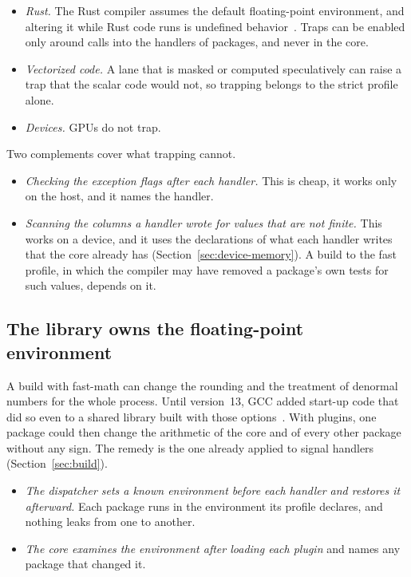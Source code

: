\documentclass[11pt,a4paper]{article}
\begin{document}
\begin{itemize}
  \item \emph{Rust.}  The Rust compiler assumes the default floating-point
        environment, and altering it while Rust code runs is undefined
        behavior~\cite{rustfenv}.  Traps can be enabled only around calls
        into the handlers of packages, and never in the core.
  \item \emph{Vectorized code.}  A lane that is masked or computed
        speculatively can raise a trap that the scalar code would not, so
        trapping belongs to the strict profile alone.
  \item \emph{Devices.}  GPUs do not trap.
\end{itemize}

Two complements cover what trapping cannot.

\begin{itemize}
  \item \emph{Checking the exception flags after each handler.}  This is
        cheap, it works only on the host, and it names the handler.
  \item \emph{Scanning the columns a handler wrote for values that are not
        finite.}  This works on a device, and it uses the declarations of
        what each handler writes that the core already has
        (Section~\ref{sec:device-memory}).  A build to the fast profile, in
        which the compiler may have removed a package's own tests for such
        values, depends on it.
\end{itemize}

\subsection{The library owns the floating-point environment}

A build with fast-math can change the rounding and the treatment of
denormal numbers for the whole process.  Until version~13, GCC added
start-up code that did so even to a shared library built with those
options~\cite{gcc13}.  With plugins, one package could then change the
arithmetic of the core and of every other package without any sign.  The
remedy is the one already applied to signal handlers
(Section~\ref{sec:build}).

\begin{itemize}
  \item \emph{The dispatcher sets a known environment before each handler
        and restores it afterward.}  Each package runs in the environment
        its profile declares, and nothing leaks from one to another.
  \item \emph{The core examines the environment after loading each plugin}
        and names any package that changed it.
\end{itemize}
\end{document}

